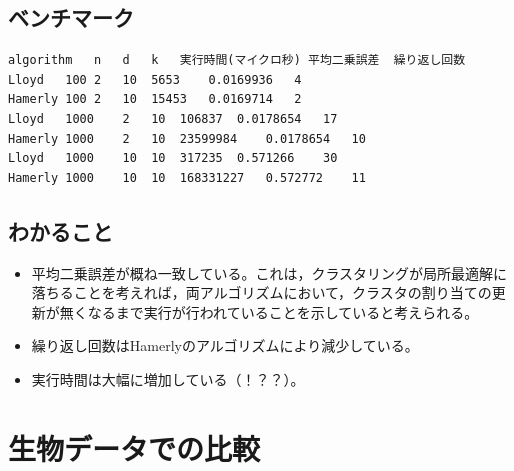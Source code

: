 \documentclass[10pt,a4,uplatex]{jsarticle}
\begin{document}
\subsection{ベンチマーク}
\begin{lstlisting}[caption=Hamerlyのアルゴリズムの実行結果]
algorithm	n	d	k	実行時間(マイクロ秒)	平均二乗誤差	繰り返し回数
Lloyd	100	2	10	5653	0.0169936	4
Hamerly	100	2	10	15453	0.0169714	2
Lloyd	1000	2	10	106837	0.0178654	17
Hamerly	1000	2	10	23599984	0.0178654	10
Lloyd	1000	10	10	317235	0.571266	30
Hamerly	1000	10	10	168331227	0.572772	11
\end{lstlisting}


\subsection{わかること}
\begin{itemize}
\item 平均二乗誤差が概ね一致している。これは，クラスタリングが局所最適解に落ちることを考えれば，両アルゴリズムにおいて，クラスタの割り当ての更新が無くなるまで実行が行われていることを示していると考えられる。
\item 繰り返し回数はHamerlyのアルゴリズムにより減少している。
\item 実行時間は大幅に増加している（！？？）。
\end{itemize}

\section{生物データでの比較}


\end{document}
